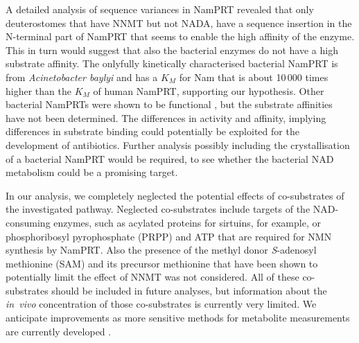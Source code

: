 A detailed analysis of sequence variances in NamPRT revealed that only deuterostomes that have NNMT but not NADA, have a sequence insertion in the N-terminal part of NamPRT that seems to enable the high affinity of the enzyme. This in turn would suggest that also the bacterial enzymes do not have a high substrate affinity. The onlyfully  kinetically characterised bacterial NamPRT is from \textit{Acinetobacter baylyi} \cite{Sorci2010} and has a $K_{M}$ for Nam that is about 10\,000 times higher than the $K_{M}$ of human NamPRT, supporting our hypothesis. Other bacterial NamPRTs were shown to be functional \cite{Martin2001,Gerdes2006}, but the substrate affinities have not been determined. The differences in activity and affinity, implying differences in substrate binding could potentially be exploited for the development of antibiotics. Further analysis possibly including the crystallisation of a bacterial NamPRT would be required, to see whether the bacterial NAD metabolism could be a promising target.


In our analysis, we completely neglected the potential effects of co-substrates of the investigated pathway. Neglected co-substrates include targets of the NAD-consuming enzymes, such as acylated proteins for sirtuins, for example, or phosphoribosyl pyrophosphate (PRPP) and ATP that are required for NMN synthesis by NamPRT. Also the presence of the methyl donor \textit{S}-adenosyl methionine (SAM) and its precursor methionine that have been shown to potentially limit the effect of NNMT \cite{Ulanovskaya2013} was not considered. All of these co-substrates should be included in future analyses, but information about the \textit{in~vivo} concentration of those co-substrates is currently very limited. We anticipate improvements as more sensitive methods for metabolite measurements are currently developed .


